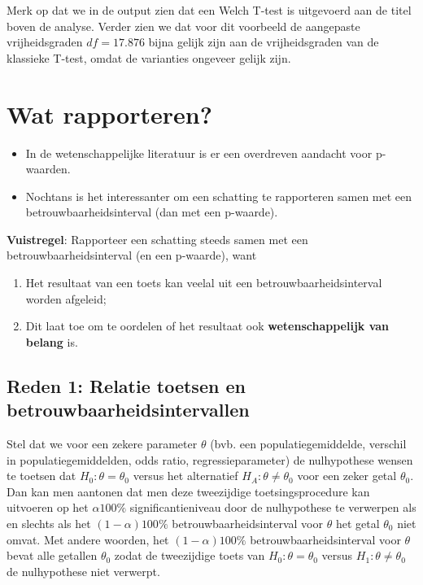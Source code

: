 \documentclass[
  12pt,dutch,coursenotes]{book}
\providecommand{\tightlist}{%
  \setlength{\itemsep}{0pt}\setlength{\parskip}{0pt}}
\theoremstyle{definition}
\theoremstyle{definition}
\theoremstyle{definition}
\theoremstyle{definition}
\theoremstyle{remark}
\begin{document}
Merk op dat we in de output zien dat een Welch T-test is uitgevoerd aan de titel boven de analyse.
Verder zien we dat voor dit voorbeeld de aangepaste vrijheidsgraden \(df = 17.876\) bijna gelijk zijn aan de vrijheidsgraden van de klassieke T-test, omdat de varianties ongeveer gelijk zijn.

\hypertarget{wat-rapporteren-1}{%
\section{Wat rapporteren?}\label{wat-rapporteren-1}}

\begin{itemize}
\tightlist
\item
  In de wetenschappelijke literatuur is er een overdreven aandacht voor p-waarden.
\item
  Nochtans is het interessanter om een schatting te rapporteren samen met een betrouwbaarheidsinterval (dan met een p-waarde).
\end{itemize}

\textbf{Vuistregel}:
Rapporteer een schatting steeds samen met een betrouwbaarheidsinterval (en een p-waarde), want

\begin{enumerate}
\def\labelenumi{\arabic{enumi}.}
\tightlist
\item
  Het resultaat van een toets kan veelal uit een betrouwbaarheidsinterval worden afgeleid;
\item
  Dit laat toe om te oordelen of het resultaat ook \textbf{wetenschappelijk van belang} is.
\end{enumerate}

\hypertarget{reden-1-relatie-toetsen-en-betrouwbaarheidsintervallen}{%
\subsection{Reden 1: Relatie toetsen en betrouwbaarheidsintervallen}\label{reden-1-relatie-toetsen-en-betrouwbaarheidsintervallen}}

Stel dat we voor een zekere parameter \(\theta\) (bvb. een
populatiegemiddelde, verschil in populatiegemiddelden, odds ratio,
regressieparameter) de nulhypothese wensen te toetsen dat \(H_0 : \theta= \theta_0\) versus het alternatief \(H_A : \theta \neq \theta_0\) voor een zeker
getal \(\theta_0\). Dan kan men aantonen dat men deze tweezijdige
toetsingsprocedure kan uitvoeren op het \(\alpha 100\%\) significantieniveau
door de nulhypothese te verwerpen als en slechts als het \((1-\alpha)100\%\)
betrouwbaarheidsinterval voor \(\theta\) het getal \(\theta_0\) niet omvat. Met
andere woorden, het \((1-\alpha)100\%\) betrouwbaarheidsinterval voor \(\theta\)
bevat alle getallen \(\theta_0\) zodat de tweezijdige toets van \(H_0 : \theta= \theta_0\) versus \(H_1 : \theta \neq \theta_0\) de nulhypothese niet verwerpt.
\end{document}
